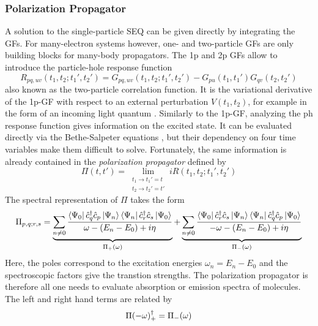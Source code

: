 \subsubsection{Polarization Propagator}

A solution to the single-particle SEQ can be given directly by integrating the GFs. For many-electron systems however, one- and two-particle GFs are only building blocks for many-body propagators. The 1p and 2p GFs allow to introduce the particle-hole response function 
\begin{equation}
R_{pq,uv}(t_1,t_2;t_1',t_2') = G_{pq,uv}(t_1,t_2;t_1',t_2') - G_{pu}(t_1,t_1')G_{qv}(t_2,t_2')
\end{equation}
\noindent also known as the two-particle correlation function. It is the variational derivative of the 1p-GF with respect to an external perturbation $V(t_1,t_2)$, for example in the form of an incoming light quantum \cite{Bay1962}. Similarly to the 1p-GF, analyzing the ph response function gives information on the excited state. It can be evaluated directly via the Bethe-Salpeter equations \cite{Nam1950,Sal1951}, but their dependency on four time variables make them difficult to solve. Fortunately, the same information is already contained in the \emph{polarization propagator} defined by
\begin{equation}
\Pi(t,t') = \lim_{\substack{t_1 \rightarrow t_1'=t \\
t_2 \rightarrow t_2' = t'}} iR(t_1,t_2;t_1',t_2')
\end{equation}  
\noindent The spectral representation of $\Pi$ takes the form
\begin{equation}
\Pi _{p,q;r,s} = \underbrace{ \sum_{n \neq 0} \frac{ 
	\bra{\Psi_0} \hat{c}_q ^{\dagger} \hat{c}_p 		\ket{\Psi_n} \bra{\Psi_n} \hat{c}_r ^{\dagger} \hat{c}_s \ket{\Psi_0}
}{
	\omega - (E_n - E_0) + i \eta
} }_\text{$\Pi _+(\omega)$} + \underbrace{ \sum_{n \neq 0} \frac{ 
	\bra{\Psi_0} \hat{c}_r ^{\dagger} \hat{c}_s \ket{\Psi_n} \bra{\Psi_n} \hat{c}_q ^{\dagger} \hat{c}_p \ket{\Psi_0}
}{
	- \omega - (E_n - E_0) + i \eta
} }_\text{$\Pi _-(\omega)$}
\label{eq:POLPROP}
\end{equation}
\noindent Here, the poles correspond to the excitation energies $\omega_n = E_n - E_0$ and the spectroscopic factors give the transtion strengths. The polarization propagator is therefore all one needs to evaluate absorption or emission spectra of molecules. The left and right hand terms are related by
\begin{equation}
\Pi(-\omega)_{+}^{\dagger} = \Pi_{-}(\omega)
\end{equation}

